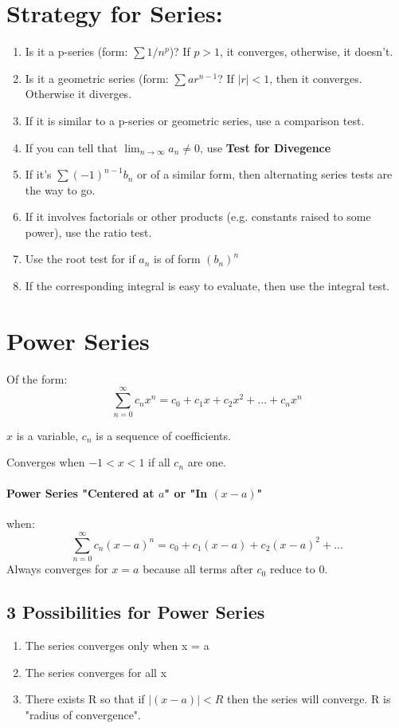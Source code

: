 \documentclass[a4paper,12pt]{report}
\begin{document}
\section{Strategy for Series: }
\begin{enumerate}
\item Is it a p-series (form: $\sum 1/{n^p}$)? If $p > 1$, it converges, otherwise, it doesn't. 
\item Is it a geometric series (form: $\sum ar^{n-1}$? If $|r| < 1$, then it converges. Otherwise it diverges.
\item If it is similar to a p-series or geometric series, use a comparison test.
\item If you can tell that $\lim_{n\to\infty} a_n \neq 0$, use \textbf{Test for Divegence} 
\item If it's $\sum(-1)^{n-1}b_n$ or of a similar form, then alternating series tests are the way to go. 
\item If it involves factorials or other products (e.g. constants raised to some power), use the ratio test. 
\item Use the root test for if $a_n$ is of form $(b_n)^n$
\item If the corresponding integral is easy to evaluate, then use the integral test. 
\end{enumerate}

\section{Power Series}
Of the form: 
$$\sum_{n=0}^{\infty} c_n x^n = c_0 + c_1x + c_2x^2 + ... + c_nx^n$$

$x$ is a variable, $c_n$ is a sequence of coefficients.

Converges when $-1 < x < 1$ if all $c_n$ are one. 

\paragraph{Power Series "Centered at $a$" or "In $(x-a)$"} when:
$$\sum_{n=0}^{\infty} c_n(x-a)^n = c_0 + c_1(x-a) + c_2(x-a)^2 + ...$$
Always converges for $x = a$ because all terms after $c_0$ reduce to 0.

\subsection{3 Possibilities for Power Series}
\begin{enumerate}
\item The series converges only when x = a
\item The series converges for all x
\item There exists R so that if $|(x-a)| < R$ then the series will converge. R is "radius of convergence".
\end{enumerate}
\end{document}
